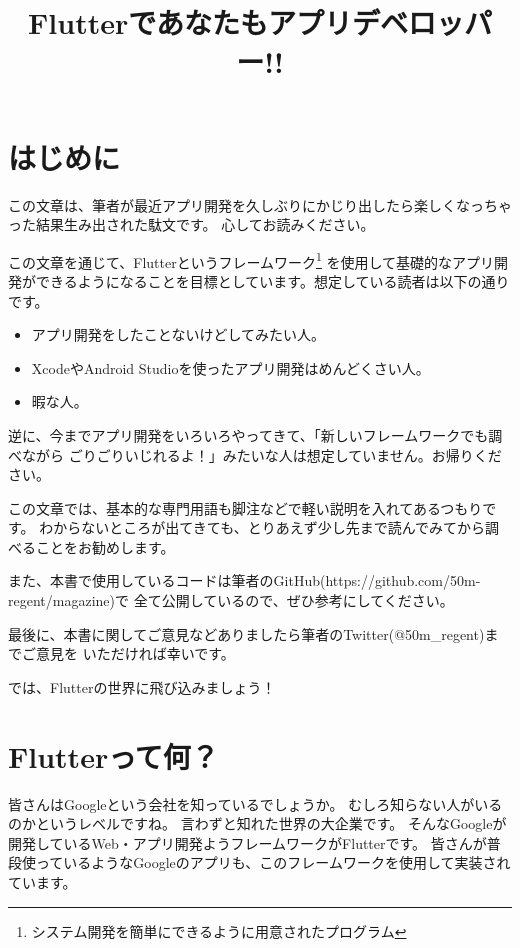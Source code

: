\documentclass{jsarticle}
\title{Flutterであなたもアプリデベロッパー!!}
\author{}
\date{}
\begin{document}
    \maketitle
    \tableofcontents

    \section*{はじめに}
        この文章は、筆者が最近アプリ開発を久しぶりにかじり出したら楽しくなっちゃった結果生み出された駄文です。
        心してお読みください。

        この文章を通じて、Flutterというフレームワーク\footnote{システム開発を簡単にできるように用意されたプログラム}
        を使用して基礎的なアプリ開発ができるようになることを目標としています。想定している読者は以下の通りです。

        \begin{itemize}
            \item アプリ開発をしたことないけどしてみたい人。
            \item XcodeやAndroid Studioを使ったアプリ開発はめんどくさい人。
            \item 暇な人。
        \end{itemize}

        逆に、今までアプリ開発をいろいろやってきて、「新しいフレームワークでも調べながら
        ごりごりいじれるよ！」みたいな人は想定していません。お帰りください。

        この文章では、基本的な専門用語も脚注などで軽い説明を入れてあるつもりです。
        わからないところが出てきても、とりあえず少し先まで読んでみてから調べることをお勧めします。

        また、本書で使用しているコードは筆者のGitHub(https://github.com/50m-regent/magazine)で
        全て公開しているので、ぜひ参考にしてください。

        最後に、本書に関してご意見などありましたら筆者のTwitter(@50m\_regent)までご意見を
        いただければ幸いです。

        では、Flutterの世界に飛び込みましょう！

    \section*{Flutterって何？}
        皆さんはGoogleという会社を知っているでしょうか。
        むしろ知らない人がいるのかというレベルですね。
        言わずと知れた世界の大企業です。
        そんなGoogleが開発しているWeb・アプリ開発ようフレームワークがFlutterです。
        皆さんが普段使っているようなGoogleのアプリも、このフレームワークを使用して実装されています。
\end{document}
